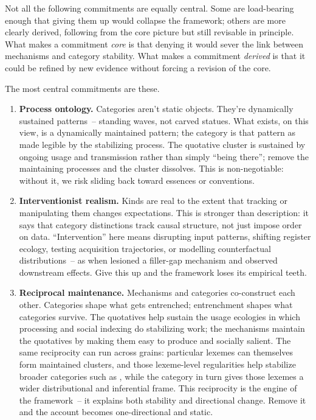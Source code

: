 Not all the following commitments are equally central. Some are load-bearing enough that giving them up would collapse the framework; others are more clearly derived, following from the core picture but still revisable in principle. What makes a commitment \emph{core} is that denying it would sever the link between mechanisms and category stability. What makes a commitment \emph{derived} is that it could be refined by new evidence without forcing a revision of the core.

The most central commitments are these.

\begin{enumerate}
\item \textbf{Process ontology.} Categories aren't static objects. They're dynamically sustained patterns~-- standing waves, not carved statues. What exists, on this view, is a dynamically maintained pattern; the category is that pattern as made legible by the stabilizing process. The quotative cluster is sustained by ongoing usage and transmission rather than simply \enquote{being there}; remove the maintaining processes and the cluster dissolves. This is non-negotiable: without it, we risk sliding back toward essences or conventions.

\item \textbf{Interventionist realism.} Kinds are real to the extent that tracking or manipulating them changes expectations. This is stronger than description: it says that category distinctions track causal structure, not just impose order on data. \enquote{Intervention} here means disrupting input patterns, shifting register ecology, testing acquisition trajectories, or modelling counterfactual distributions~-- as when \textcite{boguraev2025} lesioned a filler-gap mechanism and observed downstream effects. Give this up and the framework loses its empirical teeth.

\item \textbf{Reciprocal maintenance.} Mechanisms and categories co-construct each other. Categories shape what gets entrenched; entrenchment shapes what categories survive. The quotatives help sustain the usage ecologies in which processing and social indexing do stabilizing work; the mechanisms maintain the quotatives by making them easy to produce and socially salient. The same reciprocity can run across grains: particular lexemes can themselves form maintained clusters, and those lexeme-level regularities help stabilize broader categories such as , while the category in turn gives those lexemes a wider distributional and inferential frame. This reciprocity is the engine of the framework~-- it explains both stability and directional change. Remove it and the account becomes one-directional and static.
\end{enumerate}

